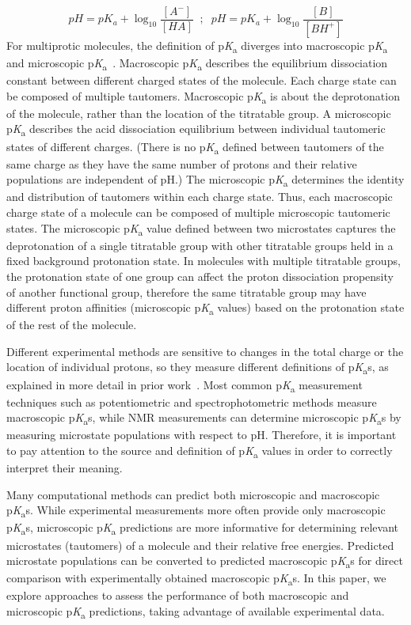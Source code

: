 \documentclass[9pt,lineno,final]{elife}
\newcommand{\pKa}{p\textit{K}\textsubscript{a}}
\begin{document}
\begin{equation}
pH = pK_a + \log_{10}{\frac{[A^-]}{[HA]}}\;\; ; \;\;pH = pK_a + \log_{10}{\frac{[B]}{[BH^+]}}
\label{eq:pH_dependency_of_deprotonation}
\end{equation}
For multiprotic molecules, the definition of \pKa{} diverges into macroscopic \pKa{} and microscopic \pKa{}~\citep{Darvey:1995:Biochem.Educ., Bodner:1986:J.Chem.Educ., Murray:1995:Anal.Chem.}. 
Macroscopic \pKa{} describes the equilibrium dissociation constant between different charged states of the molecule. 
Each charge state can be composed of multiple tautomers. 
Macroscopic \pKa{} is about the deprotonation of the molecule, rather than the location of the titratable group. 
A microscopic \pKa{} describes the acid dissociation equilibrium between individual tautomeric states of different charges. 
(There is no \pKa{} defined between tautomers of the same charge as they have the same number of protons and their relative populations are independent of pH.)
The microscopic \pKa{} determines the identity and distribution of tautomers within each charge state.
Thus, each macroscopic charge state of a molecule can be composed of multiple microscopic tautomeric states.
The microscopic \pKa{} value defined between two microstates captures the deprotonation of a single titratable group with other titratable groups held in a fixed background protonation state. 
In molecules with multiple titratable groups, the protonation state of one group can affect the proton dissociation propensity of another functional group, therefore the same titratable group may have different proton affinities (microscopic \pKa{} values) based on the protonation state of the rest of the molecule.

Different experimental methods are sensitive to changes in the total charge or the location of individual protons, so they measure different definitions of \pKa{}s, as explained in more detail in prior work~\citep{Isik:2018:J.Comput.AidedMol.Des.}. 
Most common \pKa{} measurement techniques such as potentiometric and spectrophotometric methods measure macroscopic \pKa{}s, while NMR measurements can determine microscopic \pKa{}s by measuring microstate populations with respect to pH. 
Therefore, it is important to pay attention to the source and definition of \pKa{} values in order to correctly interpret their meaning. 

Many computational methods can predict both microscopic and macroscopic \pKa{}s. While experimental measurements more often provide only macroscopic \pKa{}s,  microscopic \pKa{} predictions are more informative for determining relevant microstates (tautomers) of a molecule and their relative free energies. 
Predicted microstate populations can be converted to predicted macroscopic \pKa{}s for direct comparison with experimentally obtained macroscopic \pKa{}s. 
In this paper, we explore approaches to assess the performance of both macroscopic and microscopic \pKa{} predictions, taking advantage of available experimental data.
\end{document}
